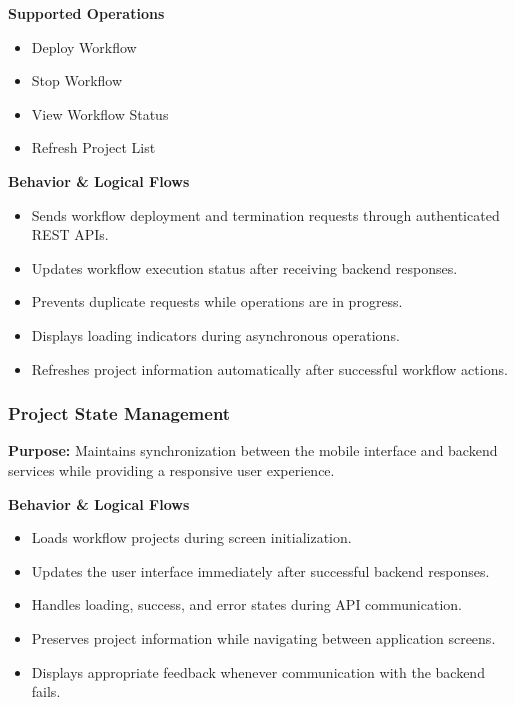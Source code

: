 \vspace{0.2cm}
\noindent\textbf{Supported Operations}

\begin{itemize}
    \item Deploy Workflow
    \item Stop Workflow
    \item View Workflow Status
    \item Refresh Project List
\end{itemize}

\vspace{0.2cm}
\noindent\textbf{Behavior \& Logical Flows}

\begin{itemize}
    \item Sends workflow deployment and termination requests through authenticated REST APIs.
    \item Updates workflow execution status after receiving backend responses.
    \item Prevents duplicate requests while operations are in progress.
    \item Displays loading indicators during asynchronous operations.
    \item Refreshes project information automatically after successful workflow actions.
\end{itemize}


\subsubsection{Project State Management}

\textbf{Purpose:}
Maintains synchronization between the mobile interface and backend services while providing a responsive user experience.

\vspace{0.2cm}
\noindent\textbf{Behavior \& Logical Flows}

\begin{itemize}
    \item Loads workflow projects during screen initialization.
    \item Updates the user interface immediately after successful backend responses.
    \item Handles loading, success, and error states during API communication.
    \item Preserves project information while navigating between application screens.
    \item Displays appropriate feedback whenever communication with the backend fails.
\end{itemize}
